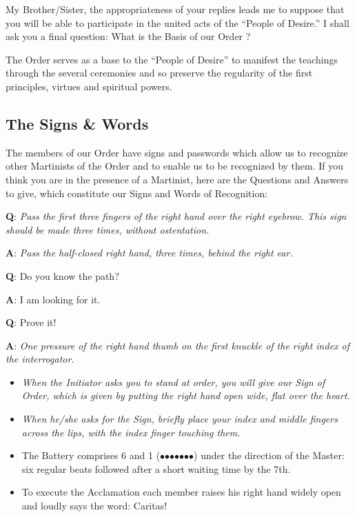 \mi{}	My Brother/Sister, the appropriateness of your replies leads me to suppose that you will be able to participate in the united acts of the ``People of Desire.'' I shall ask you a final question: What is the Basis of our Order ? 

\unk{}	The Order serves as a base to the ``People of Desire'' to manifest the teachings through the several ceremonies and so preserve the regularity of the first principles, virtues and spiritual powers. 

\subsection{The Signs \& Words}

The members of our Order have signs and passwords which allow us to 
recognize other Martinists of the Order and to enable us to be recognized by 
them. If you think you are in the presence of a Martinist, here are the 
Questions and Answers to give, which constitute our Signs and Words of Recognition: 

\textbf{Q}: \textit{Pass the first three fingers of the right hand over the right eyebrow. This sign should be made three times, without ostentation.}

\textbf{A}: \textit{Pass the half-closed right hand, three times, behind the right ear.} 

\textbf{Q}: Do you know the path? 

\textbf{A}: I am looking for it. 

\textbf{Q}: Prove it! 

\textbf{A}: \textit{One pressure of the right hand thumb on the first knuckle of the right index of the interrogator.} 

\begin{itemize}

\item \textit{When the Initiator asks you to stand at order, you will give our 
Sign of Order, which is given by putting the right hand open 
wide, flat over the heart.} 

\item \textit{When he/she asks for the Sign, briefly place your index and 
middle fingers across the lips, with the index finger touching 
them.} 

\item The Battery comprises 6 and 1 ($\bullet$\hspace*{1ex}$\bullet$\hspace*{1ex}$\bullet$\hspace*{1ex}$\bullet$\hspace*{1ex}$\bullet$\hspace*{1ex}$\bullet$\hspace*{3ex}$\bullet$) under the direction 
of the Master: six regular beats followed after a short waiting time by the 7th. 

\item To execute the Acclamation each member raises his right hand 
widely open and loudly says the word: Caritas!

\end{itemize}

